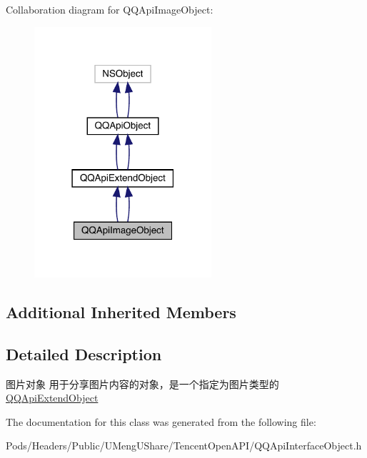 Collaboration diagram for Q\+Q\+Api\+Image\+Object\+:\nopagebreak
\begin{figure}[H]
\begin{center}
\leavevmode
\includegraphics[width=186pt]{interface_q_q_api_image_object__coll__graph}
\end{center}
\end{figure}
\subsection*{Additional Inherited Members}


\subsection{Detailed Description}
图片对象 用于分享图片内容的对象，是一个指定为图片类型的{\ttfamily \mbox{\hyperlink{interface_q_q_api_extend_object}{Q\+Q\+Api\+Extend\+Object}}} 

The documentation for this class was generated from the following file\+:\begin{DoxyCompactItemize}
\item 
Pods/\+Headers/\+Public/\+U\+Meng\+U\+Share/\+Tencent\+Open\+A\+P\+I/Q\+Q\+Api\+Interface\+Object.\+h\end{DoxyCompactItemize}
